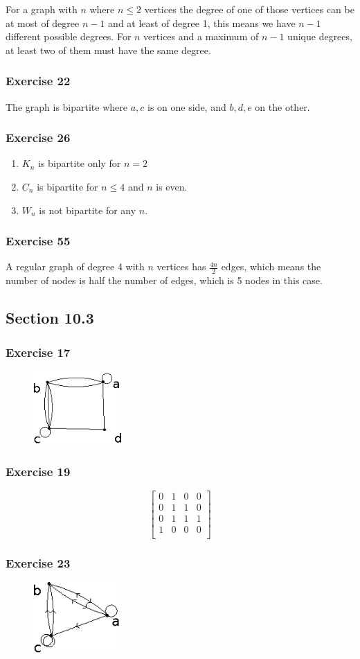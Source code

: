 \documentclass[a4paper]{article}
\newcommand{\ex}[1]{\subsubsection*{#1}}
\begin{document}
For a graph with \(n\) where \(n \leq 2\) vertices the degree of one of those
    vertices can be at most of degree \(n - 1\) and at least of degree 1, this
    means we have \(n-1\) different possible degrees. For \(n\) vertices and a
    maximum of \(n-1\) unique degrees, at least two of them must have the same
    degree.

\ex{Exercise 22}

The graph is bipartite where \(a, c\) is on one side, and \(b, d, e\) on the other. 

\ex{Exercise 26}

\begin{enumerate}[label=\alph*)]
    \item \(K_n\) is bipartite only for \(n=2\)
    \item \(C_n\) is bipartite for \(n \leq 4\) and \(n\) is even.
    \item \(W_n\) is not bipartite for any \(n\).
\end{enumerate}

\ex{Exercise 55}

A regular graph of degree 4 with \(n\) vertices has \(\frac{4n}{2}\) edges,
    which means the number of nodes is half the number of edges, which is 5
    nodes in this case. 

\subsection*{Section 10.3}

\ex{Exercise 17}

\begin{figure}[H]
    \centering
    \includegraphics[width=0.3\textwidth]{10-3-17.eps}
\end{figure}

\ex{Exercise 19}

\[
    \begin{bmatrix}
        0 & 1 & 0 & 0 \\
        0 & 1 & 1 & 0 \\
        0 & 1 & 1 & 1 \\
        1 & 0 & 0 & 0 \\
    \end{bmatrix}
\]


\ex{Exercise 23}

\begin{figure}[H]
    \centering
    \includegraphics[width=0.3\textwidth]{10-3-23.eps}
\end{figure}

%
\end{document}
